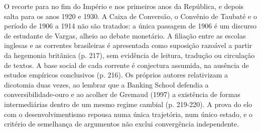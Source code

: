O recorte para no fim do Império e nos primeiros anos da República, e depois
salta para os anos 1920 e 1930. A Caixa de Conversão, o Convênio de Taubaté e
o período de 1906 a 1914 não são tratados: a única passagem de 1906 é um
discurso de estudante de Vargas, alheio ao debate monetário. A filiação entre
as escolas inglesas e as correntes brasileiras é apresentada como suposição
razoável a partir da hegemonia britânica (p. 217), sem evidência de leitura,
tradução ou circulação de textos. A base social de cada corrente é conjectura
assumida, na ausência de estudos empíricos conclusivos (p. 216). Os próprios
autores relativizam a dicotomia duas vezes, ao lembrar que a Banking School
defendia a conversibilidade-ouro e ao acolher de Gremaud (1997) a existência
de formas intermediárias dentro de um mesmo regime cambial (p. 219-220). A
prova do elo com o desenvolvimentismo repousa numa única trajetória, num único
estado, e o critério de semelhança de argumentos não exclui convergência
independente.

